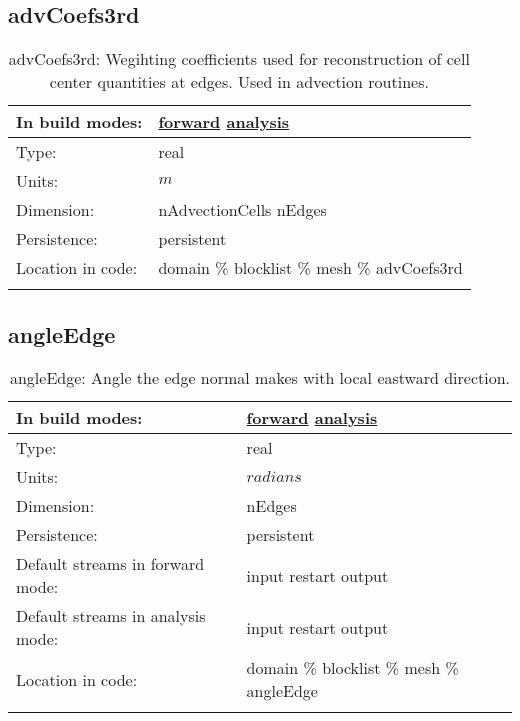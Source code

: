 \subsection[advCoefs3rd]{advCoefs3rd}
\label{subsec:var_sec_mesh_advCoefs3rd}
\begin{center}
\begin{longtable}{| p{2.0in} | p{4.0in} |}
        \hline 
        In build modes: & \hyperref[subsec:forward_var_tab_mesh]{forward} \hyperref[subsec:analysis_var_tab_mesh]{analysis} \\
        \hline 
        Type: & real \\
        \hline 
        Units: & $m$ \\
        \hline 
        Dimension: & nAdvectionCells nEdges \\
        \hline 
        Persistence: & persistent \\
        \hline 
		 Location in code: & domain \% blocklist \% mesh \% advCoefs3rd \\
		 \hline 
    \caption{advCoefs3rd: Wegihting coefficients used for reconstruction of cell center quantities at edges. Used in advection routines.}
\end{longtable}
\end{center}
\subsection[angleEdge]{angleEdge}
\label{subsec:var_sec_mesh_angleEdge}
\begin{center}
\begin{longtable}{| p{2.0in} | p{4.0in} |}
        \hline 
        In build modes: & \hyperref[subsec:forward_var_tab_mesh]{forward} \hyperref[subsec:analysis_var_tab_mesh]{analysis} \\
        \hline 
        Type: & real \\
        \hline 
        Units: & $radians$ \\
        \hline 
        Dimension: & nEdges \\
        \hline 
        Persistence: & persistent \\
        \hline 
		 Default streams in forward mode: &  input restart output \\
        \hline 
		 Default streams in analysis mode: &  input restart output \\
        \hline 
		 Location in code: & domain \% blocklist \% mesh \% angleEdge \\
		 \hline 
    \caption{angleEdge: Angle the edge normal makes with local eastward direction.}
\end{longtable}
\end{center}
